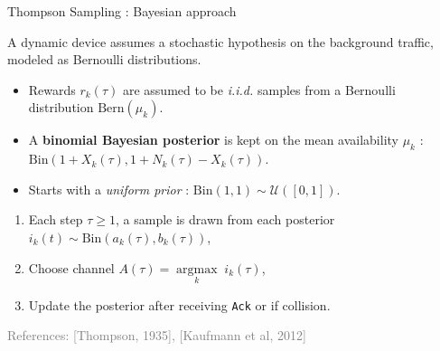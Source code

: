 \documentclass[12pt,english,ignorenonframetext,aspectratio=169,]{beamer}
\providecommand{\tightlist}{%
  \setlength{\itemsep}{0pt}\setlength{\parskip}{0pt}}
\begin{document}
\begin{frame}[noframenumbering]{Thompson Sampling : Bayesian approach}

A dynamic device assumes a stochastic hypothesis on the background
traffic, modeled as Bernoulli distributions.

\begin{itemize}
\item
  Rewards \(r_k(\tau)\) are assumed to be \emph{i.i.d.} samples from a
  Bernoulli distribution \(\mathrm{Bern}(\mu_k)\).
\item
  A \textbf{binomial Bayesian posterior} is kept on the mean
  availability \(\mu_k\) :
  \(\mathrm{Bin}(1 + X_k(\tau), 1 + N_k(\tau) - X_k(\tau))\).
\item
  Starts with a \emph{uniform prior} :
  \(\mathrm{Bin}(1, 1) \sim \mathcal{U}([0,1])\).
\end{itemize}

\begin{enumerate}
\def\labelenumi{\arabic{enumi}.}
\tightlist
\setlength{\itemindent}{1em}  %
\item
  Each step \(\tau \geq 1\), a sample is drawn from each posterior
  \(i_k(t) \sim \mathrm{Bin}(a_k(\tau), b_k(\tau))\),
\item
  Choose channel \(A(\tau) = \mathop{\arg\max}\limits_k \; i_k(\tau)\),
\item
  Update the posterior after receiving \texttt{Ack} or if collision.
\end{enumerate}

\vfill{}\hfill{}\tiny{\textcolor{gray}{References: [Thompson, 1935], [Kaufmann et al, 2012]}}

\end{frame}

\backupend
\end{document}

